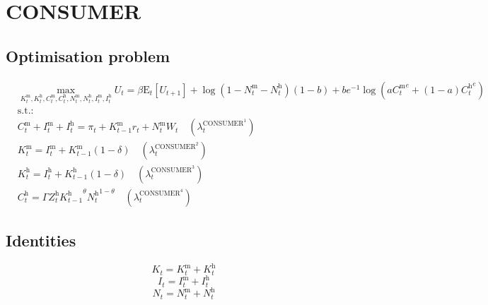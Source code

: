 

\section{CONSUMER}

\subsection{Optimisation problem}

\begin{align}
&\max_{K^{\mathrm{m}}_{t}, K^{\mathrm{h}}_{t}, C^{\mathrm{m}}_{t}, C^{\mathrm{h}}_{t}, N^{\mathrm{m}}_{t}, N^{\mathrm{h}}_{t}, I^{\mathrm{m}}_{t}, I^{\mathrm{h}}_{t}
} U_{t} = {\beta} {\mathrm{E}_{t}\left[U_{t+1}\right]} + {\log\left(1 - N^{\mathrm{m}}_{t} - N^{\mathrm{h}}_{t}\right)} \left(1 - b\right) + {b} {e}^{-1} {\log\left({a} {{C^{\mathrm{m}}_{t}}^{e}} + \left(1 - a\right) {{C^{\mathrm{h}}_{t}}^{e}}\right)}\\
&\mathrm{s.t.:}\nonumber\\
& C^{\mathrm{m}}_{t} + I^{\mathrm{m}}_{t} + I^{\mathrm{h}}_{t} = \pi_{t} + {K^{\mathrm{m}}_{t-1}} {r_{t}} + {N^{\mathrm{m}}_{t}} {W_{t}} \quad \left(\lambda^{\mathrm{CONSUMER}^{\mathrm{1}}}_{t}\right)\\
& K^{\mathrm{m}}_{t} = I^{\mathrm{m}}_{t} + {K^{\mathrm{m}}_{t-1}} \left(1 - \delta\right) \quad \left(\lambda^{\mathrm{CONSUMER}^{\mathrm{2}}}_{t}\right)\\
& K^{\mathrm{h}}_{t} = I^{\mathrm{h}}_{t} + {K^{\mathrm{h}}_{t-1}} \left(1 - \delta\right) \quad \left(\lambda^{\mathrm{CONSUMER}^{\mathrm{3}}}_{t}\right)\\
& C^{\mathrm{h}}_{t} = {\Gamma} {Z^{\mathrm{h}}_{t}} {{K^{\mathrm{h}}_{t-1}}^{\theta}} {{N^{\mathrm{h}}_{t}}^{1 - \theta}} \quad \left(\lambda^{\mathrm{CONSUMER}^{\mathrm{4}}}_{t}\right)
\end{align}


\subsection{Identities}

\begin{equation}
K_{t} = K^{\mathrm{m}}_{t} + K^{\mathrm{h}}_{t}
\end{equation}
\begin{equation}
I_{t} = I^{\mathrm{m}}_{t} + I^{\mathrm{h}}_{t}
\end{equation}
\begin{equation}
N_{t} = N^{\mathrm{m}}_{t} + N^{\mathrm{h}}_{t}
\end{equation}


